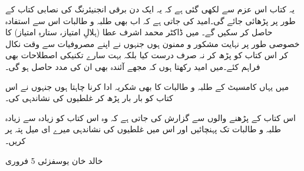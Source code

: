 یہ کتاب اس عزم سے لکھی گئی ہے کہ یہ ایک دن برقی انجنیئرنگ کی نصابی کتاب کے طور پر پڑھائی جائے گی۔امید کی جاتی ہے کہ اب بھی طلبہ و طالبات اس سے استفادہ حاصل کر سکیں گے۔
میں ڈاکٹر محمد اشرف عطا (ہلالِ امتیاز، ستارہِ امتیاز) کا خصوصی طور پر نہایت مشکور و ممنون ہوں جنہوں نے اپنے مصروفیات سے وقت نکال کر اس کتاب کو پڑھ کر نہ صرف درست کیا بلکہ بہت سارے تکنیکی اصطلاحات بھی فراہم کئے۔میں امید رکھتا ہوں کہ مجھے  آئندہ بھی ان کی مدد حاصل ہو گی۔

میں یہاں کامسیٹ کے طلبہ و طالبات کا بھی شکریہ ادا کرنا چاہتا ہوں جنہوں نے اس کتاب کو بار بار پڑھ کر غلطیوں کی نشاندہی کی۔

اس کتاب کے پڑھنے والوں سے گزارش کی جاتی ہے کہ وہ اس کتاب کو زیادہ سے زیادہ طلبہ و طالبات تک پہنچائیں اور اس میں غلطیوں کی نشاندہی میرے ای میل پتہ پر کریں۔

خالد خان یوسفزئی
5 فروری  
